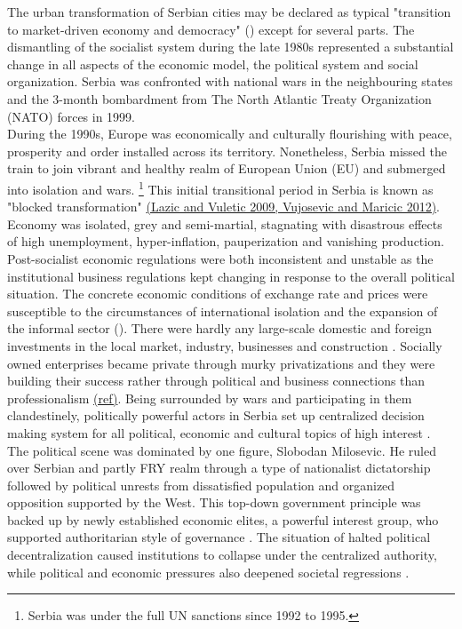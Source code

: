 \documentclass[11pt]{report}
\begin{document}
The urban transformation of Serbian cities may be declared as typical "transition to market-driven economy and democracy" (\href{ref}{\citealt{tsenkova_beyond_2006}}) except for several parts. The dismantling of the socialist system during the late 1980s represented a substantial change in all aspects of the economic model, the political system and social organization.
Serbia was confronted with national wars in the neighbouring states and the 3-month bombardment from The North Atlantic Treaty Organization (NATO) forces in 1999.
\\

During the 1990s, Europe was economically and culturally flourishing with peace, prosperity and order installed across its territory.
Nonetheless, Serbia missed the train to join vibrant and healthy realm of European Union (EU) and submerged into isolation and wars. \footnote{Serbia was under the full UN sanctions since 1992 to 1995.} 
This initial transitional period in Serbia is known as "blocked transformation" \href{ref}{(Lazic and Vuletic 2009, Vujosevic and Maricic 2012)}.
Economy was isolated, grey and semi-martial, stagnating with disastrous effects of high unemployment, hyper-inflation, pauperization and vanishing production.
Post-socialist economic regulations were both inconsistent and unstable as the institutional business regulations kept changing in response to the overall political situation. The concrete economic conditions of exchange rate and prices were susceptible to the circumstances of international isolation and the expansion of the informal sector (\cite{from Grozdanic find references}).
There were hardly any large-scale domestic and foreign investments in the local market, industry, businesses and construction \href{ref}{\citealt{vujosevic_planning_2006}}.
Socially owned enterprises became private through murky privatizations and they were building their success rather through political and business connections than professionalism \href{ref}{(ref)}.
Being surrounded by wars and participating in them clandestinely, politically powerful actors in Serbia set up centralized decision making system for all political, economic and cultural topics of high interest \href{ref}{\citealt{nedovic-budic_mornings_2011}}.
The political scene was dominated by one figure, Slobodan Milosevic.
He ruled over Serbian and partly FRY realm through a type of nationalist dictatorship followed by political unrests from dissatisfied population and organized opposition supported by the West.
This top-down government principle was backed up by newly established economic elites, a powerful interest group, who supported authoritarian style of governance \href{ref}{\citealt{vujovic_belgrades_2007}}.
The situation of halted political decentralization caused institutions to collapse under the centralized authority, while political and economic pressures also deepened societal regressions \href{ref}{\citealt{nedovic-budic_mornings_2011}}. 
\\
\end{document}
